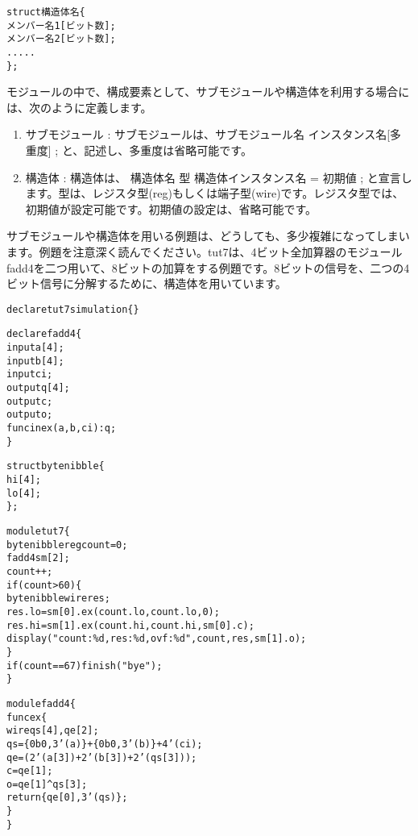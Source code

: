 \begin{reviewemlist}
\begin{alltt}
struct 構造体名 \{
 メンバー名1[ビット数];
 メンバー名2[ビット数];
 .....
\} ;
\end{alltt}
\end{reviewemlist}

モジュールの中で、構成要素として、サブモジュールや構造体を利用する場合には、次のように定義します。

\begin{enumerate}
\item サブモジュール  : サブモジュールは、サブモジュール名 インスタンス名[多重度] ; と、記述し、多重度は省略可能です。
\item 構造体 : 構造体は、 構造体名 型 構造体インスタンス名 = 初期値 ; と宣言します。型は、レジスタ型(reg)もしくは端子型(wire)です。レジスタ型では、初期値が設定可能です。初期値の設定は、省略可能です。
\end{enumerate}

サブモジュールや構造体を用いる例題は、どうしても、多少複雑になってしまいます。例題を注意深く読んでください。tut7は、4ビット全加算器のモジュールfadd4を二つ用いて、8ビットの加算をする例題です。8ビットの信号を、二つの4ビット信号に分解するために、構造体を用いています。

\begin{reviewlist}
\begin{alltt}
declare tut7 simulation \{\}

declare fadd4 \{
       input a[4];
       input b[4];
       input ci;
       output q[4];
       output c;
       output o;
       func\textunderscore{}in ex(a,b,ci) : q;
\}

struct byte\textunderscore{}nibble \{
       hi[4];
       lo[4];
\} ;

module tut7 \{
       byte\textunderscore{}nibble reg count = 0 ;
       fadd4 sm[2];
       count++;
       if(count\textgreater{}60) \{
               byte\textunderscore{}nibble wire res;
               res.lo=sm[0].ex(count.lo,count.lo,0);
               res.hi=sm[1].ex(count.hi,count.hi,sm[0].c);
               \textunderscore{}display("count:\%d, res:\%d, ovf:\%d", count, res,sm[1].o);
       \}
       if(count==67) \textunderscore{}finish("bye");
\}

module fadd4 \{
       func ex \{
               wire qs[4],qe[2];
               qs = \{0b0,3'(a)\} + \{0b0,3'(b)\} + 4'(ci);
               qe = (2'(a[3])+2'(b[3])+2'(qs[3]));
               c = qe[1];
               o = qe[1] \textasciicircum{} qs[3];
               return \{qe[0],3'(qs)\};
       \}
\}
\end{alltt}
\end{reviewlist}


